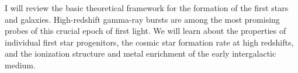 


\bigskip



\bigskip

\noindent I will review the basic theoretical framework for the formation of the first stars and galaxies. High-redshift gamma-ray bursts are among the most promising probes of this crucial epoch of first light. We will learn about the properties of individual first star progenitors, the cosmic star formation rate at high redshifts, and the ionization structure and metal enrichment of the early intergalactic medium.

